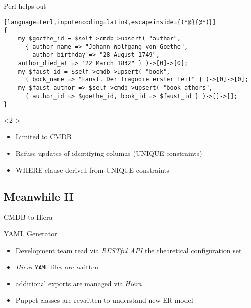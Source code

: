 \documentclass[ngerman,xcolor={table,dvipsnames},smaller,compress,hyperref={bookmarks,colorlinks}]{beamer}%
\begin{document}
\begin{frame}[fragile]{}
\begin{block}{Perl helps out}
\scriptsize
\begin{lstlisting}[language=Perl,inputencoding=latin9,escapeinside={(*@}{@*)}]
{
    my $goethe_id = $self->cmdb->upsert( "author",
      { author_name => "Johann Wolfgang von Goethe",
        author_birthday => "28 August 1749",
	author_died_at => "22 March 1832" } )->[0]->[0];
    my $faust_id = $self->cmdb->upsert( "book",
      { book_name => "Faust. Der Tragödie erster Teil" } )->[0]->[0];
    my $faust_author => $self->cmdb->upsert( "book_athors",
      { author_id => $goethe_id, book_id => $faust_id } )->[]->[];
}
\end{lstlisting}
\end{block}

\begin{block}<2->{}
\begin{itemize}
\item Limited to CMDB
\item<3-> Refuse updates of identifying columns (UNIQUE constraints)
\item<4-> WHERE clause derived from UNIQUE constraints
\end{itemize}
\end{block}
\end{frame}

\subsection{Meanwhile II}

\begin{frame}[fragile]{CMDB to Hiera}
\begin{block}{YAML Generator}
\begin{itemize}
\item Development team read via \textit{RESTful API} the theoretical configuration set
\item<2-> \textit{Hiera} \texttt{YAML} files are written
\item<3-> additional exports are managed via \textit{Hiera}
\item<4-> Puppet classes are rewritten to understand new ER model
\end{itemize}
\end{block}
\end{frame}

\end{document}
